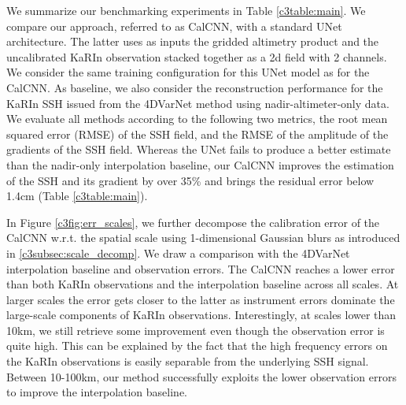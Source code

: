 \begin{bibunit}
We summarize our benchmarking experiments in Table \ref{c3table:main}.
We compare our approach, referred to as CalCNN, with a standard UNet \cite{Ronneberger_Fischer_Brox_2015} architecture. The latter uses as inputs the gridded altimetry product and the uncalibrated KaRIn observation stacked together as a 2{\sc d} field with 2 channels. We consider the same training configuration for this UNet model as for the CalCNN.
As baseline, we also consider the reconstruction performance for the KaRIn SSH issued from the 4DVarNet method using nadir-altimeter-only data. 
We evaluate all methods according to the following two metrics, the root mean squared error (RMSE) of the SSH field, and the RMSE of the amplitude of the gradients of the SSH field. 
Whereas the UNet fails to produce a better estimate than the nadir-only interpolation baseline, our CalCNN improves the estimation of the SSH and its gradient by over 35\% and brings the residual error below 1.4cm (Table \ref{c3table:main}).

In Figure \ref{c3fig:err_scales}, we further decompose the calibration error of the CalCNN w.r.t. the spatial scale using 1-dimensional Gaussian blurs as introduced in \ref{c3subsec:scale_decomp}. We draw a comparison with the 4DVarNet interpolation baseline and observation errors. The CalCNN reaches a lower error than both KaRIn observations and the interpolation baseline across all scales. At larger scales the error gets closer to the latter as instrument errors dominate the large-scale components of KaRIn observations. 
Interestingly, at scales lower than 10km, we still retrieve some improvement even though the observation error is quite high.
This can be explained by the fact that the high frequency errors on the KaRIn observations is easily separable from the underlying SSH signal.
Between 10-100km, our method successfully exploits the lower observation errors to improve the interpolation baseline.




\end{bibunit}
